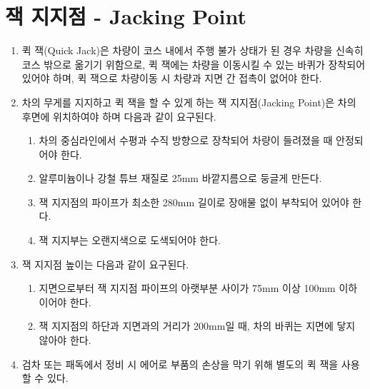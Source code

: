 \documentclass[final,a4paper,10pt]{report}
\begin{document}
\section{잭 지지점 - Jacking Point}\label{rule:formula-technical.jacking-point}
\begin{enumerate}
  \item\label{rule:formula-technical.jacking-point.wheeled-no-ground-contact} 퀵 잭(Quick Jack)은 차량이 코스 내에서 주행 불가 상태가 된 경우 차량을 신속히 코스 밖으로 옮기기 위함으로, 퀵 잭에는 차량을 이동시킬 수 있는 바퀴가 장착되어 있어야 하며, 퀵 잭으로 차량이동 시 차량과 지면 간 접촉이 없어야 한다.

  \item\label{rule:formula-technical.jacking-point.rear-jacking-point} 차의 무게를 지지하고 퀵 잭을 할 수 있게 하는 잭 지지점(Jacking Point)은 차의 후면에 위치하여야 하며 다음과 같이 요구된다.
    \begin{enumerate}
      \item\label{rule:formula-technical.jacking-point.rear-jacking-point.centerline-alignment} 차의 중심라인에서 수평과 수직 방향으로 장착되어 차량이 들려졌을 때 안정되어야 한다.
      \item\label{rule:formula-technical.jacking-point.rear-jacking-point.tube-diameter-25mm} 알루미늄이나 강철 튜브 재질로 25mm 바깥지름으로 둥글게 만든다.
      \item\label{rule:formula-technical.jacking-point.rear-jacking-point.min-length-280mm} 잭 지지점의 파이프가 최소한 280mm 길이로 장애물 없이 부착되어 있어야 한다.
      \item\label{rule:formula-technical.jacking-point.rear-jacking-point.painted-orange} 잭 지지부는 오랜지색으로 도색되어야 한다.
    \end{enumerate}

  \item\label{rule:formula-technical.jacking-point.height} 잭 지지점 높이는 다음과 같이 요구된다.
    \begin{enumerate}
      \item\label{rule:formula-technical.jacking-point.height.pipe-height-75to100mm} 지면으로부터 잭 지지점 파이프의 아랫부분 사이가 75mm 이상 100mm 이하이어야 한다.
      \item\label{rule:formula-technical.jacking-point.height.wheel-clearance-at-200mm} 잭 지지점의 하단과 지면과의 거리가 200mm일 때, 차의 바퀴는 지면에 닿지 않아야 한다.
    \end{enumerate}
  \item\label{rule:formula-technical.jacking-point.spare-jack-protects-aero} 검차 또는 패독에서 정비 시 에어로 부품의 손상을 막기 위해 별도의 퀵 잭을 사용할 수 있다.
\end{enumerate}
\end{document}

